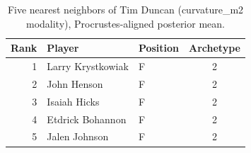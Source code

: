 \begin{table}[htbp]
  \centering\small
  \begin{tabular}{rllc}
    \toprule
    Rank & Player & Position & Archetype \\
    \midrule
    1 & Larry Krystkowiak & F & 2 \\
    2 & John Henson & F & 2 \\
    3 & Isaiah Hicks & F & 2 \\
    4 & Etdrick Bohannon & F & 2 \\
    5 & Jalen Johnson & F & 2 \\
    \bottomrule
  \end{tabular}
  \caption{Five nearest neighbors of Tim Duncan (curvature_m2 modality), Procrustes-aligned posterior mean.}
  \label{tab:Tim_Duncan_neighbors_curvature_m2}
\end{table}

